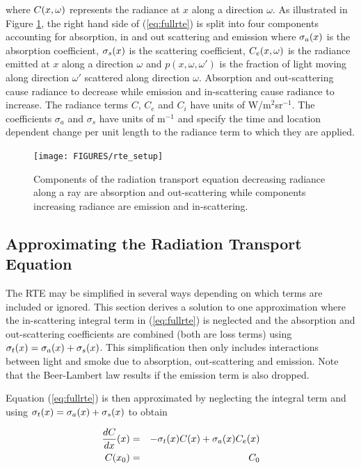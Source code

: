 \noindent where  $C(x,\omega)$ represents the  radiance at $x$ along a direction $\omega$.
As illustrated in Figure \ref{figRadiance}, the right hand side of (\ref{eq:fullrte}) is split into four components accounting for absorption, in and out scattering and emission where $\sigma_a(x)$ is the absorption coefficient, $\sigma_s(x)$ is the scattering coefficient, $C_e(x,\omega)$ is the radiance emitted at $x$ along a direction $\omega$ and $p(x,\omega,\omega')$ is the fraction of light moving along direction $\omega'$ scattered along direction $\omega$. Absorption and out-scattering cause radiance to decrease while emission and in-scattering cause radiance to increase. The radiance terms $C$, $C_e$ and $C_i$ have units of W/m$^2$sr$^{-1}$.  The coefficients $\sigma_a$ and $\sigma_s$ have units of m$^{-1}$ and specify the time and location dependent change per unit length to the radiance term to which they are applied.

\begin{figure}[\figoptions]
\begin{center}
\texttt{[image: FIGURES/rte\_setup]}
\end{center}
\caption{Components of the radiation transport equation decreasing radiance along a ray are
absorption and out-scattering while components increasing radiance are emission and in-scattering.}
\label{figRadiance}
\end{figure}


\subsection{Approximating the Radiation Transport Equation}

The RTE may be simplified in several ways depending on which terms are included or ignored.  This section derives a solution to one approximation where the in-scattering integral term in (\ref{eq:fullrte}) is neglected and the absorption and out-scattering coefficients are combined (both are loss terms) using $\sigma_t(x)=\sigma_a(x)+\sigma_s(x)$.  This simplification then only includes interactions between light and smoke due to absorption,  out-scattering and emission.  Note that the Beer-Lambert law results if the emission term is also dropped.

Equation (\ref{eq:fullrte}) is then approximated by neglecting the integral term and using $\sigma_t(x)=\sigma_a(x)+\sigma_s(x)$ to obtain

\begin{eqnarray*}
\frac{dC}{dx}(x)&=&-\sigma_t(x) C(x) + \sigma_a(x) C_e(x)\\
 C(x_0)&=&C_0
\end{eqnarray*}

